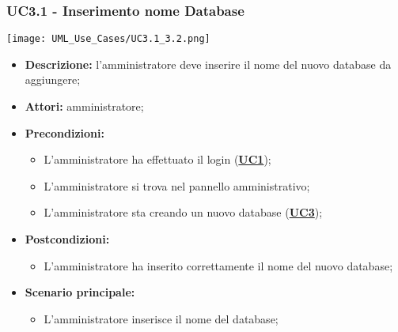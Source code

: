 \subsubsection{UC3.1 - Inserimento nome Database}
\label{sec:UC3.1}
\texttt{[image: UML\_Use\_Cases/UC3.1\_3.2.png]}
\begin{itemize}
	\item \textbf{Descrizione:} l’amministratore deve inserire il nome del nuovo database da aggiungere;
	\item \textbf{Attori:} amministratore;
	\item \textbf{Precondizioni:} 
	\begin{itemize}
		\item L’amministratore ha effettuato il login (\hyperref[sec:UC1]{\textbf{UC1}});
		\item L’amministratore si trova nel pannello amministrativo;
		\item L’amministratore sta creando un nuovo database (\hyperref[sec:UC3]{\textbf{UC3}});
	\end{itemize}
	\item \textbf{Postcondizioni:} 
	\begin{itemize}
		\item L'amministratore ha inserito correttamente il nome del nuovo database;
	\end{itemize}
	\item \textbf{Scenario principale:} 
	\begin{itemize}
		\item L’amministratore inserisce il nome del database;
	\end{itemize}
\end{itemize}

